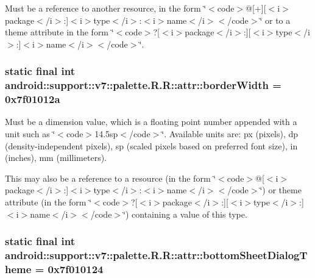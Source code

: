 Must be a reference to another resource, in the form \char`\"{}$<$code$>$@\mbox{[}+\mbox{]}\mbox{[}$<$i$>$package$<$/i$>$:\mbox{]}$<$i$>$type$<$/i$>$:$<$i$>$name$<$/i$>$$<$/code$>$\char`\"{} or to a theme attribute in the form \char`\"{}$<$code$>$?\mbox{[}$<$i$>$package$<$/i$>$:\mbox{]}\mbox{[}$<$i$>$type$<$/i$>$:\mbox{]}$<$i$>$name$<$/i$>$$<$/code$>$\char`\"{}. \hypertarget{classandroid_1_1support_1_1v7_1_1palette_1_1_r_1_1attr_04532bb2fe6b7cc71984a029140fbeff}{
\subsubsection[{borderWidth}]{\setlength{\rightskip}{0pt plus 5cm}static final int android::support::v7::palette.R.R::attr::borderWidth = 0x7f01012a}}
\label{classandroid_1_1support_1_1v7_1_1palette_1_1_r_1_1attr_04532bb2fe6b7cc71984a029140fbeff}


Must be a dimension value, which is a floating point number appended with a unit such as \char`\"{}$<$code$>$14.5sp$<$/code$>$\char`\"{}. Available units are: px (pixels), dp (density-independent pixels), sp (scaled pixels based on preferred font size), in (inches), mm (millimeters). 

This may also be a reference to a resource (in the form \char`\"{}$<$code$>$@\mbox{[}$<$i$>$package$<$/i$>$:\mbox{]}$<$i$>$type$<$/i$>$:$<$i$>$name$<$/i$>$$<$/code$>$\char`\"{}) or theme attribute (in the form \char`\"{}$<$code$>$?\mbox{[}$<$i$>$package$<$/i$>$:\mbox{]}\mbox{[}$<$i$>$type$<$/i$>$:\mbox{]}$<$i$>$name$<$/i$>$$<$/code$>$\char`\"{}) containing a value of this type. \hypertarget{classandroid_1_1support_1_1v7_1_1palette_1_1_r_1_1attr_5c34bfb3ba6d0b33253fac95b43cd07f}{
\subsubsection[{bottomSheetDialogTheme}]{\setlength{\rightskip}{0pt plus 5cm}static final int android::support::v7::palette.R.R::attr::bottomSheetDialogTheme = 0x7f010124}}
\label{classandroid_1_1support_1_1v7_1_1palette_1_1_r_1_1attr_5c34bfb3ba6d0b33253fac95b43cd07f}


